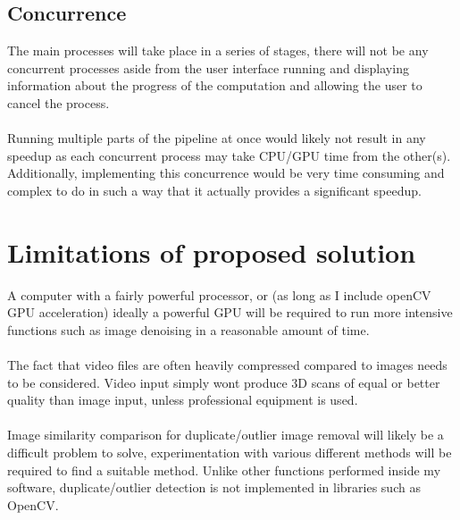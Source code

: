 \documentclass[11pt]{report}
\begin{document}
\subsection{Concurrence}
The main processes will take place in a series of stages, there will not be any concurrent processes aside from the user interface running and displaying information about the progress of the computation and allowing the user to cancel the process.\\\\
Running multiple parts of the pipeline at once would likely not result in any speedup as each concurrent process may take CPU/GPU time from the other(s). Additionally, implementing this concurrence would be very time consuming and complex to do in such a way that it actually provides a significant speedup.

\section{Limitations of proposed solution}
A computer with a fairly powerful processor, or (as long as I include openCV GPU acceleration) ideally a powerful GPU will be required to run more intensive functions such as image denoising in a reasonable amount of time.\\\\
The fact that video files are often heavily compressed compared to images needs to be considered. Video input simply wont produce 3D scans of equal or better quality than image input, unless professional equipment is used.\\\\
Image similarity comparison for duplicate/outlier image removal will likely be a difficult problem to solve, experimentation with various different methods will be required to find a suitable method. Unlike other functions performed inside my software, duplicate/outlier detection is not implemented in libraries such as OpenCV.
\end{document}
